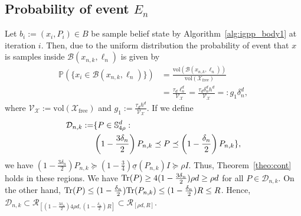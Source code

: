\documentclass[Afour,sageh,times]{sagej}
\begin{document}
\subsection{Probability of event \texorpdfstring{$E_n$}{En}\label{subsec:event_E}}
\label{sec:enent_E_n}
Let $b_i:=(x_i,P_i) \in B$ be sample belief state by Algorithm~\ref{alg:igpp_body1} at iteration $i$. Then, due to the uniform distribution the probability of event that $x$ is samples inside $\mathcal{B}(x_{n,k},\ell_n)$ is given by
\begin{align} \nonumber
    \mathbb{P}(\{x_i\in\mathcal{B}(x_{n,k},\ell_n)\})\!&=\!\frac{\text{vol}(\mathcal{B}(x_{n,k},\ell_n))}{\text{vol}(\mathcal{X}_{\text{free}})}
    \\ 
    &=\frac{\tau_d\ell^{d}_n}{\mathcal{V}_{\mathcal{X}}}
    =  \frac{\tau_d\delta_n^{d} h^d}{  \mathcal{V}_{\mathcal{X}}}=: g_1 \delta_n^{d},
    \!\nonumber   
\end{align}
where $\mathcal{V}_{\mathcal{X} }:=\text{vol}(\mathcal{X}_{\text{free}})$ and $g_1:= \frac{\tau_d  h^d}{  \mathcal{V}_{\mathcal{X}}}$.
If we define
\begin{align}
\small
    \mathcal{D}_{n, k} :=&\{P\in\mathbb{S}^d_{4\rho}:\nonumber\\
    &\left(1-\frac{3 \delta_n}{2}\right) P_{n,k} \preceq P\preceq \left(1-\frac{\delta_n}{2}\right) P_{n,k}\},\nonumber
\end{align} 
we have $\left(1-\frac{3 \delta_n}{2}\right) P_{n,k} \succeq \left(1-\frac{3}{4}\right) \underline{\sigma}(P_{n,k}) I \succeq \rho I$. Thus, Theorem~\ref{theo:cont} holds in these regions.
We have  $\textup{Tr}(P) \geq 4 (1-\frac{3 \delta_n}{2})  \rho d \geq \rho d$ for all $P \in \mathcal{D}_{n, k}$.
On the other hand, $\textup{Tr}(P)\leq (1-\frac{\delta_n}{2}) \textup{Tr}(P_{n,k}) \leq  (1-\frac{\delta_n}{2}) R \leq R $. Hence, $\mathcal{D}_{n,k} \subset \mathcal{R}_{ [(1-\frac{3 \delta_n}{2})  4\rho d, (1-\frac{\delta_n}{2}) R ]} \subset \mathcal{R}_{ [ \rho d, R ]}$.
\end{document}
